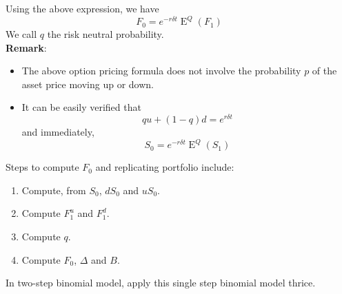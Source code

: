 \documentclass[12pt]{article}
\theoremstyle{definition}
\DeclareMathOperator{\expec}{E}
\begin{document}
Using the above expression, we have
\[
F_0=e^{-r\delta t}\expec^Q(F_1)
\]
We call $q$ the risk neutral probability.\\
\textbf{Remark}:
\begin{itemize}
	\item The above option pricing formula does not involve the probability $p$ of the asset price moving up or down.
	\item It can be easily verified that
	\[
qu+(1-q)d=e^{r\delta t}
	\]
	and immediately,
	\[
S_0=e^{-r\delta t}\expec^Q(S_1)
	\]
\end{itemize}
Steps to compute $F_0$ and replicating portfolio include:
\begin{enumerate}
  \item Compute, from $S_0$, $dS_0$ and $uS_0$.
  \item Compute $F_1^u$ and $F_1^d$.
  \item Compute $q$.
  \item Compute $F_0$, $\Delta$ and $B$.
\end{enumerate}
In two-step binomial model, apply this single step binomial model thrice.
\end{document}
